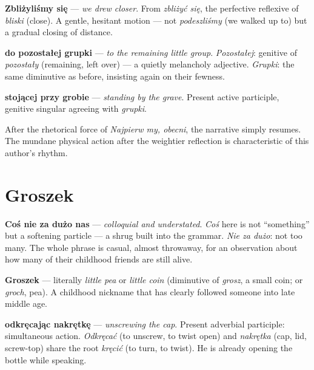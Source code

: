 

\textbf{Zbliżyliśmy się} — \textit{we drew closer}. From \textit{zbliżyć się}, 
the perfective reflexive of \textit{bliski} (close). A gentle, hesitant motion 
— not \textit{podeszliśmy} (we walked up to) but a gradual closing of distance.

\textbf{do pozostałej grupki} — \textit{to the remaining little group}. 
\textit{Pozostałej}: genitive of \textit{pozostały} (remaining, left over) 
— a quietly melancholy adjective. \textit{Grupki}: the same diminutive 
as before, insisting again on their fewness.

\textbf{stojącej przy grobie} — \textit{standing by the grave}. 
Present active participle, genitive singular agreeing with \textit{grupki}.

After the rhetorical force of \textit{Najpierw my, obecni}, the narrative 
simply resumes. The mundane physical action after the weightier reflection 
is characteristic of this author's rhythm.

\section{Groszek}


\textbf{Coś nie za dużo nas} — \textit{colloquial and understated}. \textit{Coś} 
here is not ``something'' but a softening particle — a shrug built into the grammar. 
\textit{Nie za dużo}: not too many. The whole phrase is casual, almost throwaway, 
for an observation about how many of their childhood friends are still alive.

\textbf{Groszek} — literally \textit{little pea} or \textit{little coin} 
(diminutive of \textit{grosz}, a small coin; or \textit{groch}, pea). 
A childhood nickname that has clearly followed someone into late middle age.

\textbf{odkręcając nakrętkę} — \textit{unscrewing the cap}. 
Present adverbial participle: simultaneous action. \textit{Odkręcać} 
(to unscrew, to twist open) and \textit{nakrętka} (cap, lid, screw-top) 
share the root \textit{kręcić} (to turn, to twist). He is already opening 
the bottle while speaking.

